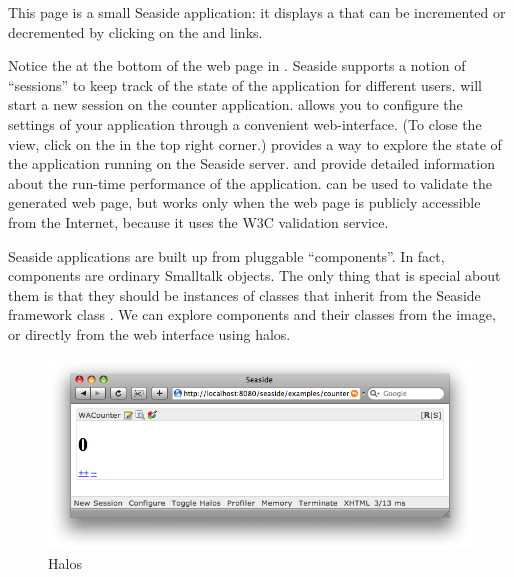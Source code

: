 \documentclass[a4paper,10pt,twoside]{book}
\begin{document}
\noindent
This page is a small Seaside application: it displays a  that can be incremented or decremented by clicking on the \link{++} and \link{--\,--} links.

\noindent
{}

Notice the  at the bottom of the web page in .
Seaside supports a notion of ``sessions'' to keep track of the state of the application for different users.
 will start a new session on the counter application.
 allows you to configure the settings of your application through a convenient web-interface.
(To close the  view, click on the  in the top right corner.)
 provides a way to explore the state of the application running on the Seaside server.
 and  provide detailed information about the run-time performance of the application.
 can be used to validate the generated web page, but works only  when the web page is publicly accessible from the Internet, because it uses the W3C validation service.

Seaside applications are built up from pluggable ``components''.
In fact, components are ordinary Smalltalk objects.
The only thing that is special about them is that they should be instances of classes that inherit from the Seaside framework class .
We can explore components and their classes from the \pharo image, or directly from the web interface using halos.

\begin{figure}[ht]
\begin{center}
\includegraphics[width=\textwidth]{counterHalos}
\caption{Halos}
\label{fig:counterHalos}
\end{center}
\end{figure}
\end{document}
